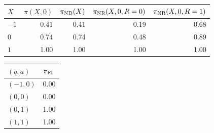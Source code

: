 \begin{tabular}{lrrrr}
\toprule
$X$ & $\pi(X,0)$ & $\pi_{\textup{ND}}(X)$ & $\pi_{\textup{NR}}(X,0,R=0)$ & $\pi_{\textup{NR}}(X,0,R=1)$ \\
\midrule
$-1$ & 0.41 & 0.41 & 0.19 & 0.68 \\
$0$ & 0.74 & 0.74 & 0.48 & 0.89 \\
$1$ & 1.00 & 1.00 & 1.00 & 1.00 \\
\bottomrule
\end{tabular}
\vspace{0.6em}
\begin{tabular}{ll}
\toprule
$(q,a)$ & $\pi_{\textup{FI}}$ \\
\midrule
$(-1,0)$ & 0.00 \\
$(0,0)$ & 0.00 \\
$(0,1)$ & 1.00 \\
$(1,1)$ & 1.00 \\
\bottomrule
\end{tabular}
